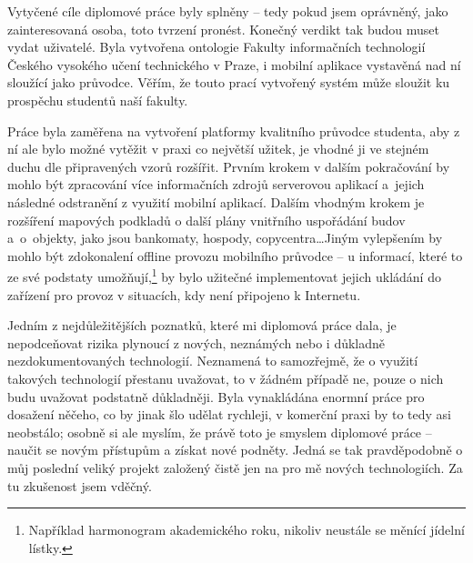 \begin{conclusion}
Vytyčené cíle diplomové práce byly splněny -- tedy pokud jsem oprávněný, jako zainteresovaná osoba, toto tvrzení pronést. Konečný verdikt tak budou muset vydat uživatelé. Byla vytvořena ontologie Fakulty informačních technologií Českého vysokého učení technického v Praze, i mobilní aplikace vystavěná nad ní sloužící jako průvodce. Věřím, že touto prací vytvořený systém může sloužit ku prospěchu studentů naší fakulty.

Práce byla zaměřena na vytvoření platformy kvalitního průvodce studenta, aby z ní ale bylo možné vytěžit v praxi co největší užitek, je vhodné ji ve stejném duchu dle připravených vzorů rozšířit. Prvním krokem v dalším pokračování by mohlo být zpracování více informačních zdrojů serverovou aplikací a~jejich následné odstranění z využití mobilní aplikací. Dalším vhodným krokem je rozšíření mapových podkladů o další plány vnitřního uspořádání budov a~o~objekty, jako jsou bankomaty, hospody, copycentra\dots Jiným vylepšením by mohlo být zdokonalení offline provozu mobilního průvodce -- u informací, které to ze své podstaty umožňují,\footnote{Například harmonogram akademického roku, nikoliv neustále se měnící jídelní lístky.} by bylo užitečné implementovat jejich ukládání do zařízení pro provoz v situacích, kdy není připojeno k Internetu.

Jedním z nejdůležitějších poznatků, které mi diplomová práce dala, je nepodceňovat rizika plynoucí z nových, neznámých nebo i důkladně nezdokumentovaných technologií. Neznamená to samozřejmě, že o využití takových technologií přestanu uvažovat, to v žádném případě ne, pouze o nich budu uvažovat podstatně důkladněji. Byla vynakládána enormní práce pro dosažení něčeho, co by jinak šlo udělat rychleji, v komerční praxi by to tedy asi neobstálo; osobně si ale myslím, že právě toto je smyslem diplomové práce -- naučit se novým přístupům a získat nové podněty. Jedná se tak pravděpodobně o můj poslední veliký projekt založený čistě jen na pro mě nových technologiích. Za tu zkušenost jsem vděčný.
\end{conclusion}
